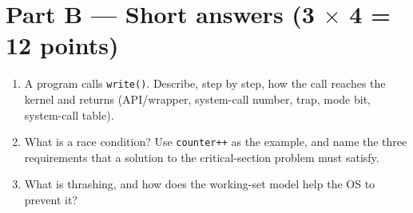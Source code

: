 \documentclass[11pt,a4paper]{article}
\begin{document}
\section*{Part B --- Short answers \hfill (3 $\times$ 4 = 12 points)}
\begin{enumerate}[leftmargin=1.8em,label=B\arabic*.]
  \item A program calls \texttt{write()}. Describe, step by step, how the call reaches the kernel and returns (API/wrapper, system-call number, trap, mode bit, system-call table). 
  \ans{3.2cm}
  \item What is a race condition? Use \texttt{counter++} as the example, and name the three requirements that a solution to the critical-section problem must satisfy. 
  \ans{3.2cm}
  \item What is thrashing, and how does the working-set model help the OS to prevent it? 
  \ans{3.2cm}
\end{enumerate}

\newpage
\end{document}
